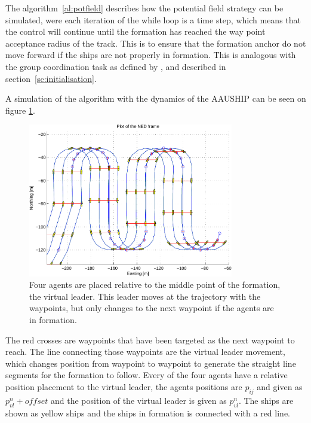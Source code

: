 The algorithm~\vref{al:potfield} describes how the potential field
strategy can be simulated, were each iteration of the while loop is a
time step, which means that the control will continue until the
formation has reached the way point acceptance radius of the track.
This is to ensure that the formation anchor do not move forward if the
ships are not properly in formation. This is analogous with the group
coordination task as defined by \citep{thorvaldsen}, and described in
section~\ref{sc:initialisation}.

A simulation of the algorithm with the dynamics of the AAUSHIP can be seen on figure \ref{fig:potform}.
\begin{figure}[htbp]
  \centering
  \includegraphics[width=0.8\textwidth]{fig/lawn-bar-formation}
  \caption{Four agents are placed relative to the middle point of the formation, the virtual leader. This leader moves at the trajectory with the waypoints, but only changes to the next waypoint if the agents are in formation.}
  \label{fig:potform}
\end{figure}
The red crosses are waypoints that have been targeted as the next waypoint to reach. The line connecting those waypoints are the virtual leader movement, which changes position from waypoint to waypoint to generate the straight line segments for the formation to follow. Every of the four agents have a relative position placement to the virtual leader, the agents positions are $p_{ij}$ and given as $p^n_{vl} + offset$ and the position of the virtual leader is given as $p^n_{vl}$. The ships are shown as yellow ships and the ships in formation is connected with a red line.

